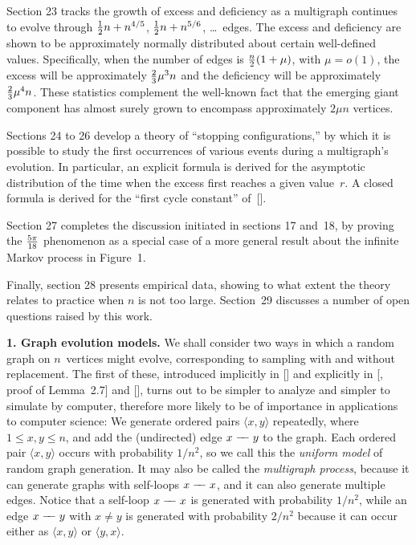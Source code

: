 Section 23 tracks the growth of excess and deficiency as a multigraph
continues to evolve through ${1\over2} n+n^{4/5}$, ${1\over2} n+n^{5/6}$,
\dots~edges. The excess and deficiency are
 shown to be approximately normally distributed about
certain well-defined values. Specifically, when the number of
edges is ${n\over2}(1+\mu)$, with $\mu=o(1)$, the excess
will be approximately ${2\over3}\mu^3n$ and the deficiency will be
approximately ${2\over3}\mu^4n$. These statistics complement the well-known
fact that the emerging giant component has almost surely grown to
encompass approximately $2\mu n$ vertices.

Sections 24 to 26 develop a theory of ``stopping configurations,'' by
which it is possible to study the first occurrences of various
events during a multigraph's evolution. 
In particular, an explicit formula is derived for
the asymptotic distribution of the time when the excess
first reaches a given value~$r$.
A closed formula is derived for the ``first cycle constant'' of~[\FKP].

Section 27 completes the discussion initiated in sections 17 and~18,
by proving the ${5\pi\over 18}$ phenomenon as a special case of a more
general result about the infinite Markov process in Figure~1.

Finally, section 28 presents empirical data, showing to what extent the
theory relates to practice when $n$ is not too large. Section~29
discusses a number of open questions raised by this work.

\bigbreak
\noindent
{\bf 1. Graph evolution models.}\enspace
We shall consider two ways in which a random graph on $n$~vertices might
evolve, corresponding to sampling with and without replacement. The first
of these, introduced implicitly in [\Bi] and explicitly in [\BF,
proof of Lemma~2.7] and [\FKP],
turns out to be simpler to analyze and simpler to simulate by
computer, therefore more likely to be of importance in applications to
computer science: We generate ordered pairs $\langle x,y\rangle$ repeatedly,
where $1\le x,y\le n$, and add the (undirected) edge
$x\rbar y$ to the graph.
Each ordered pair $\langle x,y\rangle$ occurs with probability $1/n^2$, so
we call this the {\it uniform model\/} of random graph generation. It may
also be called the {\it multigraph process}, because it can  generate
graphs with self-loops $x\rbar x$, and it can also generate 
multiple edges. Notice
that a self-loop $x\rbar x$ is generated with probability $1/n^2$, while an
edge $x\rbar y$ with $x\ne y$ is generated with probability $2/n^2$ because it can
occur either as $\langle x,y\rangle$ or $\langle y,x\rangle$.

